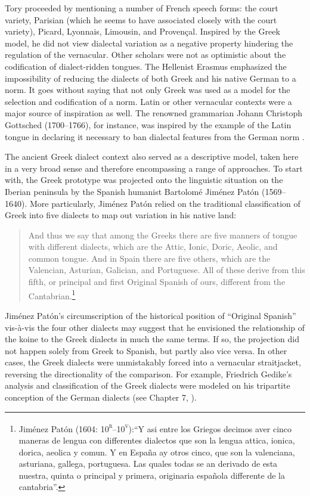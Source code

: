 \documentclass[output=paper]{langsci/langscibook}
\begin{document}
Tory proceeded by mentioning a number of French speech forms: the court variety, Parisian (which he seems to have associated closely with the court variety), Picard, Lyonnais, Limousin, and Provençal. Inspired by the Greek model, he did not view dialectal variation as a negative property hindering the regulation of the vernacular. Other scholars were not as optimistic about the codification of dialect-ridden tongues. The Hellenist Erasmus \citet[239]{Schmidt1615} emphasized the impossibility of reducing the dialects of both Greek and his native German to a norm. It goes without saying that not only Greek was used as a model for the selection and codification of a norm. Latin or other vernacular contexts were a major source of inspiration as well. The renowned grammarian Johann Christoph Gottsched (1700–1766), for instance, was inspired by the example of the Latin tongue in declaring it necessary to ban dialectal features from the German norm \citep[334]{Gottsched1748}.

The ancient Greek dialect context also served as a descriptive model, taken here in a very broad sense and therefore encompassing a range of approaches. To start with, the Greek prototype was projected onto the linguistic situation on the Iberian peninsula by the Spanish humanist Bartolomé Jiménez Patón (1569–1640). More particularly, Jiménez Patón relied on the traditional classification of Greek into five dialects to map out variation in his native land:

\begin{quote}
And thus we say that among the Greeks there are five manners of tongue with different dialects, which are the Attic, Ionic, Doric, Aeolic, and common tongue. And in Spain there are five others, which are the Valencian, Asturian, Galician, and Portuguese. All of these derive from this fifth, or principal and first Original Spanish of ours, different from the Cantabrian.\footnote{Jiménez Patón (1604: 10\textsc{\textsuperscript{r}}\textsc{–10}\textsc{\textsuperscript{v}}):“Y asi entre los Griegos decimos aver cinco maneras de lengua con differentes dialectos que son la lengua attica, ionica, dorica, aeolica y comun. Y en España ay otros cinco, que son la valenciana, asturiana, gallega, portuguesa. Las quales todas se an derivado de esta nuestra, quinta o principal y primera, originaria española differente de la cantabria”.}
\end{quote}

Jiménez Patón’s circumscription of the historical position of “Original Spanish” vis-à-vis the four other dialects may suggest that he envisioned the relationship of the koine to the Greek dialects in much the same terms. If so, the projection did not happen solely from Greek to Spanish, but partly also vice versa. In other cases, the Greek dialects were unmistakably forced into a vernacular straitjacket, reversing the directionality of the comparison. For example, Friedrich Gedike’s analysis and classification of the Greek dialects were modeled on his tripartite conception of the German dialects (see Chapter 7, ).
\end{document}
